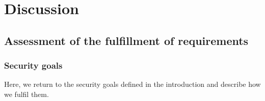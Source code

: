
\chapter{Discussion}\label{chapter:discussion}

\section{Assessment of the fulfillment of requirements}

\subsection{Security goals}

Here, we return to the security goals defined in the introduction and describe how we fulfil them.

